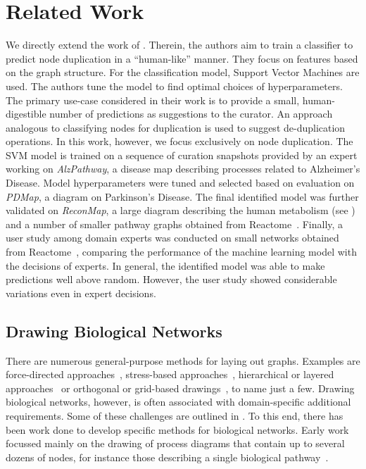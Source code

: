 \documentclass[
	fontsize=10pt, %
	twoside=true, %
	secnumdepth=1, %
  toc=indentunnumbered %
]{kaobook}
\begin{document}
\chapter{Related Work}
\label{sec:related-work}
We directly extend the work of \citeauthor{nielsen_MachineLearningSupport_2019}
\cite{nielsen_MachineLearningSupport_2019}. Therein, the authors aim to train a
classifier to predict node duplication in a ``human-like'' manner. They focus on
features based on the graph structure. For the classification model, Support
Vector Machines are used. The authors tune the model to find optimal choices of
hyperparameters. The primary use-case considered in their work is to provide a
small, human-digestible number of predictions as suggestions to the curator. An
approach analogous to classifying nodes for duplication is used to suggest
de-duplication operations. In this work, however, we focus exclusively on node
duplication. The SVM model is trained on a sequence of curation snapshots
provided by an expert working on \textit{AlzPathway}, a disease map describing
processes related to Alzheimer's Disease. Model
hyperparameters were tuned and selected based on evaluation on \textit{PDMap}, a
diagram on Parkinson's Disease. The final identified model was further validated
on \textit{ReconMap}, a large diagram describing the human metabolism (see
) and a number of smaller pathway graphs obtained
from Reactome~\cite{joshi-tope_ReactomeKnowledgebaseBiological_2005}. Finally, a
user study among domain experts was conducted on small networks obtained from
Reactome~\cite{joshi-tope_ReactomeKnowledgebaseBiological_2005}, comparing the
performance of the machine learning model with the decisions of experts.
In general, the identified model was able to make predictions well above random.
However, the user study showed considerable variations even in expert decisions.



\section{Drawing Biological Networks}

There are numerous general-purpose methods for laying out graphs. Examples are
force-directed approaches~\cite{kobourov_ForceDirectedDrawingAlgorithms_2013},
stress-based approaches~\cite{gansner_GraphDrawingStress_2005}, hierarchical or
layered approaches~\cite{healy_HierarchicalDrawingAlgorithms_2013} or orthogonal
or grid-based drawings~\cite{duncan_PlanarOrthogonalPolyline_2013}, to name just
a few. Drawing biological networks, however, is often associated with
domain-specific additional requirements. Some of these challenges are outlined
in . To this end, there has been work done to develop
specific methods for biological networks.
%
Early work focussed mainly on the drawing of process diagrams that contain up to
several dozens of nodes, for instance those describing a single biological
pathway~\cite{becker_GraphLayoutAlgorithm_2001,
  schreiber_ComparisonMetabolicPathways_2003}.
\end{document}
